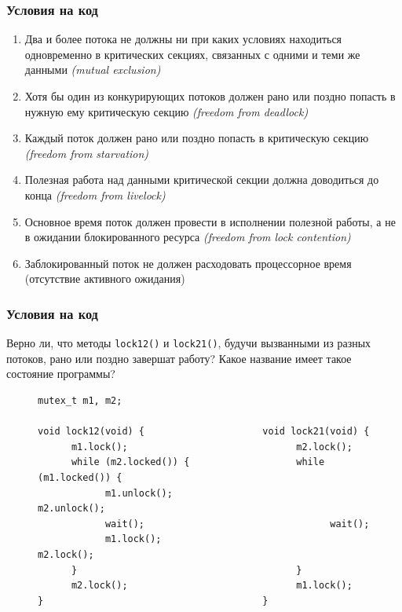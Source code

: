 \documentclass[aspectratio=169, pdf, 8pt, unicode]{beamer}
\begin{document}
\begin{frame}
\frametitle{Условия на код}
\begin{enumerate}
\item Два и более потока не должны ни при каких условиях находиться одновременно в критических секциях, связанных с одними и теми же данными
		\textit{(mutual exclusion)}
\item Хотя бы один из конкурирующих потоков должен рано или поздно попасть в нужную ему критическую секцию \textit{(freedom from deadlock)}
\item Каждый поток должен рано или поздно попасть в критическую секцию \textit{(freedom from starvation)}
\item Полезная работа над данными критической секции должна доводиться до конца \textit{(freedom from livelock)}
\item Основное время поток должен провести в исполнении полезной работы, а не в ожидании блокированного ресурса \textit{(freedom from lock contention)}
\item Заблокированный поток не должен расходовать процессорное время (отсутствие активного ожидания)
\end{enumerate}
\end{frame}

\begin{frame}[fragile]
\frametitle{Условия на код}
Верно ли, что методы \texttt{lock12()} и \texttt{lock21()}, будучи вызванными из разных потоков,
рано или поздно завершат работу? Какое название имеет такое состояние программы?
\begin{figure}[H]
\centering
\begin{BVerbatim}
mutex_t m1, m2;

void lock12(void) {                     void lock21(void) {
      m1.lock();                              m2.lock();
      while (m2.locked()) {                   while (m1.locked()) {
            m1.unlock();                            m2.unlock();
            wait();                                 wait();
            m1.lock();                              m2.lock();
      }                                       }
      m2.lock();                              m1.lock();
}                                       }
\end{BVerbatim}
\end{figure}
\end{frame}
\end{document}
